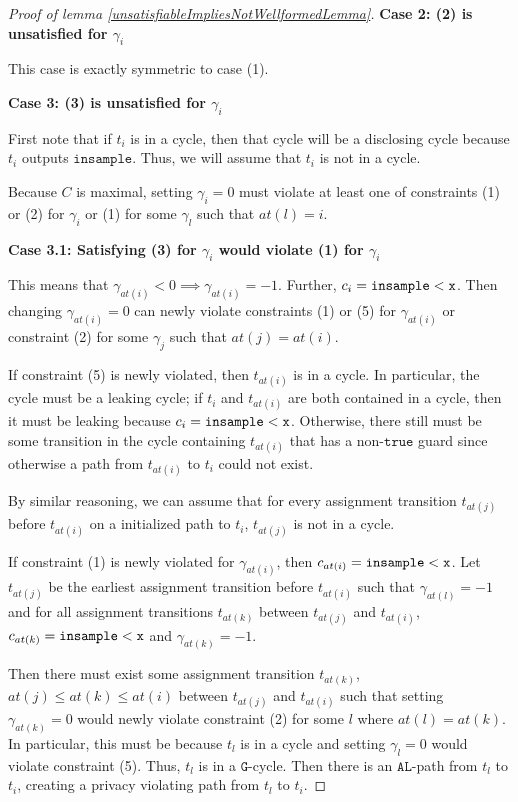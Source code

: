 \begin{proof}[Proof of lemma \ref{unsatisfiableImpliesNotWellformedLemma}]
    \textbf{Case 2: (2) is unsatisfied for $\gamma_i$}

    This case is exactly symmetric to case (1).

    \textbf{Case 3: (3) is unsatisfied for $\gamma_i$}

    First note that if $t_i$ is in a cycle, then that cycle will be a disclosing cycle because $t_i$ outputs $\texttt{insample}$. Thus, we will assume that $t_i$ is not in a cycle.

    Because $C$ is maximal, setting $\gamma_i=0$ must violate at least one of constraints (1) or (2) for $\gamma_i$ or (1) for some $\gamma_l$ such that $at(l) = i$.

    \textbf{Case 3.1: Satisfying (3) for $\gamma_i$ would violate (1) for $\gamma_i$}

    This means that $\gamma_{at(i)}<0\implies \gamma_{at(i)} = -1$. Further, $c_i = \lguard[\texttt{x}]$. Then changing $\gamma_{at(i)}=0$ can newly violate constraints (1) or (5) for $\gamma_{at(i)}$ or constraint (2) for some $\gamma_j$ such that $at(j) = at(i)$.

    If constraint (5) is newly violated, then $t_{at(i)}$ is in a cycle. In particular, the cycle must be a leaking cycle; if $t_i$ and $t_{at(i)}$ are both contained in a cycle, then it must be leaking because $c_i = \lguard[\texttt{x}]$. Otherwise, there still must be some transition in the cycle containing $t_{at(i)}$ that has a non-$\texttt{true}$ guard since otherwise a path from $t_{at(i)}$ to $t_i$ could not exist. 

    By similar reasoning, we can assume that for every assignment transition $t_{at(j)}$before $t_{at(i)}$ on a initialized path to $t_i$, $t_{at(j)}$ is not in a cycle. 

    If constraint (1) is newly violated for $\gamma_{at(i)}$, then $c_{at(i)} = \lguard[\texttt{x}]$. Let $t_{at(j)}$ be the earliest assignment transition before $t_{at(i)}$ such that $\gamma_{at(l)} = -1$ and for all assignment transitions $t_{at(k)}$ between $t_{at(j)}$ and $t_{at(i)}$, $c_{at(k)} = \lguard[\texttt{x}]$ and $\gamma_{at(k)} = -1$. 
    
    Then there must exist some assignment transition $t_{at(k)}$, $at(j)\leq at(k)\leq at(i)$ between $t_{at(j)}$ and $t_{at(i)}$ such that setting $\gamma_{at(k)} = 0$ would newly violate constraint (2) for some $l$ where $at(l) = at(k)$. In particular, this must be because $t_l$ is in a cycle and setting $\gamma_l = 0$ would violate constraint (5). Thus, $t_l$ is in a $\texttt{G}$-cycle. Then there is an $\texttt{AL}$-path from $t_l$ to $t_i$, creating a privacy violating path from $t_l$ to $t_i$. 


\end{proof}
